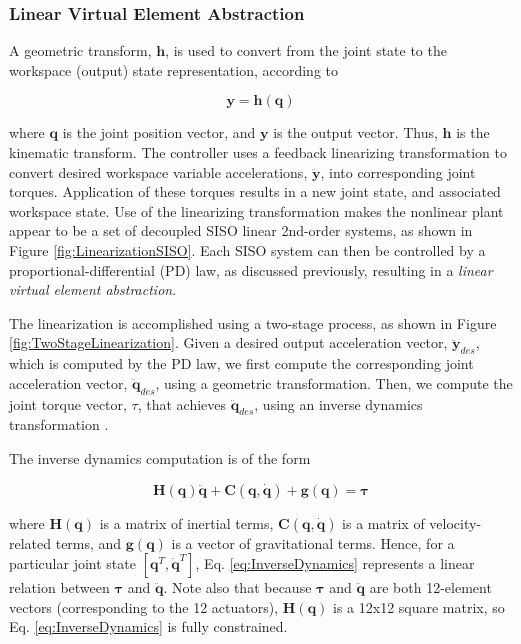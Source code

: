 \documentclass{llncs}
\begin{document}
\subsubsection{Linear Virtual Element Abstraction}

A geometric transform, $\mathbf{h}$, is used to convert from the joint state to the workspace (output) state representation, according to

\begin{equation}
\mathbf{y} = \mathbf{h} \left( \mathbf{q} \right)
\label{eq:Kinematics}
\end{equation}

\noindent where $\mathbf{q}$ is the joint position vector, and $\mathbf{y}$ is the output vector.
Thus, $\mathbf{h}$ is the kinematic transform.
The controller uses a feedback linearizing transformation to convert desired workspace variable accelerations, $\ddot{\mathbf{y}}$, 
into corresponding joint torques.  
Application of these torques results in a new joint state, and associated workspace state.  
Use of the linearizing transformation makes the nonlinear plant appear to be a set of decoupled SISO linear 2nd-order systems, 
as shown in Figure \ref{fig:LinearizationSISO}.  
Each SISO system can then be controlled by a proportional-differential (PD) law, as discussed previously, resulting in a \textit{linear virtual element abstraction}.  

The linearization is accomplished using a two-stage process, as shown in Figure \ref{fig:TwoStageLinearization}.  
Given a desired output acceleration vector, $\ddot{\mathbf{y}}_{des}$, which is computed by the PD law, we first compute the corresponding joint acceleration vector,
$\ddot{\mathbf{q}}_{des}$, using a geometric transformation.  
Then, we compute the joint torque vector, $\tau$, that achieves $\ddot{\mathbf{q}}_{des}$, using an inverse dynamics transformation \cite{craig2005introduction}.  

The inverse dynamics computation is of the form

\begin{equation}
\mathbf{H} \left( \mathbf{q} \right) \ddot{\mathbf{q}} + \mathbf{C} \left( \mathbf{q}, \dot{\mathbf{q}} \right) + \mathbf{g} \left( \mathbf{q} \right) = \mathbf{\tau}
\label{eq:InverseDynamics}
\end{equation}

\noindent where $\mathbf{H} \left( \mathbf{q} \right)$ is a matrix of inertial terms, $\mathbf{C} \left( \mathbf{q}, \dot{\mathbf{q}} \right)$ is a
matrix of velocity-related terms, and $\mathbf{g} \left( \mathbf{q} \right)$ is a vector of gravitational terms.  
Hence, for a particular joint state $\left[ \mathbf{q}^T, \dot{\mathbf{q}}^T  \right]$, Eq. \ref{eq:InverseDynamics} represents a linear relation between
$\mathbf{\tau}$ and $\ddot{\mathbf{q}}$.
Note also that because $\mathbf{\tau}$ and $\ddot{\mathbf{q}}$ are both 12-element vectors (corresponding to the 12 actuators), 
$\mathbf{H} \left( \mathbf{q} \right)$ is a 12x12 square matrix, so Eq. \ref{eq:InverseDynamics} is fully constrained.
\end{document}
